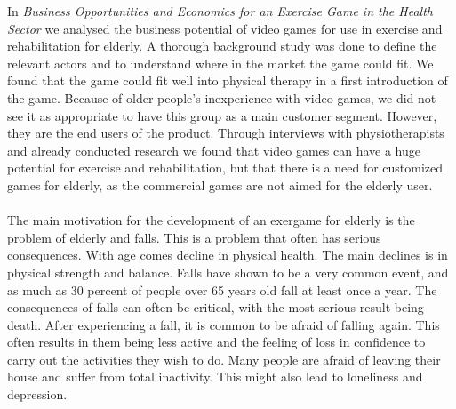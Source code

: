 In \emph{Business Opportunities and Economics for an Exercise Game in the Health Sector} we analysed the business potential of video games for use in exercise and rehabilitation for elderly. A thorough background study was done to define the relevant actors and to understand where in the market the game could fit. We found that the game could fit well into physical therapy in a first introduction of the game. Because of older people's inexperience with video games, we did not see it as appropriate to have this group as a main customer segment. However, they are the end users of the product. Through interviews with physiotherapists and already conducted research we found that video games can have a huge potential  for exercise and rehabilitation, but that there is a need for customized games for elderly, as the commercial games are not aimed for the elderly user. \\ \\
The main motivation for the development of an exergame for elderly is the problem of elderly and falls. This is a problem that often has serious consequences. With age comes decline in physical health. The main declines is in physical strength and balance. Falls have shown to be a very common event, and as much as 30 percent of people over 65 years old fall at least once a year. The consequences of falls can often be critical, with the most serious result being death. After experiencing a fall, it is common to be afraid of falling again. This often results in them being less active and the feeling of loss in confidence to carry out the activities they wish to do. Many people are afraid of leaving their house and suffer from total inactivity. This might also lead to loneliness and depression. \\ \\
